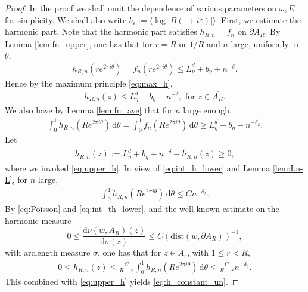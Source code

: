 \documentclass[11pt]{amsart}
\begin{document}
\begin{proof}
In the proof we shall omit the dependence of various parameters on $\omega, E$ for simplicity. We shall also write $b_{\varepsilon}:=\langle \log |B(\cdot+i\varepsilon)|\rangle$.
First, we estimate the harmonic part.
Note that the harmonic part satisfies $h_{R,n}=f_n$ on $\partial A_{R}$.
By Lemma \ref{lem:fn_upper}, one has that for $r=R$ or $1/R$ and $n$ large, uniformly in $\theta$,
\begin{align*}
h_{R,n}(re^{2\pi i\theta})=f_n(re^{2\pi i\theta})\leq L^d_{\eta}+b_{\eta}+n^{-\delta}.
\end{align*}
Hence by the maximum principle \eqref{eq:max_h},  
\begin{align}\label{eq:upper_h}
h_{R,n}(z)\leq L^d_{\eta}+b_{\eta}+n^{-\delta}, \text{ for } z\in \overline{A_{R}}.
\end{align}
We also have by Lemma \ref{lem:fn_ave} that for $n$ large enough,
\begin{align}\label{eq:int_h_lower}
\int_0^1 h_{R,n}(R e^{2\pi i\theta})\, \mathrm{d}\theta=\int_0^{1} f_n(R e^{2\pi i\theta})\, \mathrm{d}\theta\geq L^d_{\eta}+b_{\eta}-n^{-\delta_2}.
\end{align}
Let 
\begin{align}\label{def:tilde_h}
\tilde{h}_{R,n}(z):=L^d_{\eta}+b_{\eta}+n^{-\delta}-h_{R,n}(z)\geq 0,
\end{align} 
where we invoked \eqref{eq:upper_h}.
In view of \eqref{eq:int_h_lower} and Lemma \ref{lem:Ln-L},  for $n$ large,
\begin{align}\label{eq:int_th_lower}
\int_0^{1} \tilde{h}_{R,n}(R e^{2\pi i\theta})\, \mathrm{d}\theta\leq C n^{-\delta_2}.
\end{align}
By \eqref{eq:Poisson} and \eqref{eq:int_th_lower}, and the well-known estimate on the harmonic measure
$$0\leq \frac{\mathrm{d}\nu(w, A_R)(z)}{\mathrm{d}\sigma(z)}\leq C(\mathrm{dist}(w,\partial A_R))^{-1},$$ 
with arclength measure $\sigma$, 
one has that for $z\in A_r$, with $1\leq r<R$,
\begin{align*}
0\leq \tilde{h}_{R,n}(z)\leq \frac{C}{R-r} \int_{0}^{1} \tilde{h}_{R,n}(Re^{2\pi i\theta})\, \mathrm{d}\theta\leq \frac{C}{R-r} n^{-\delta_2}.
\end{align*}
This combined with \eqref{eq:upper_h} yields \eqref{eq:h_constant_un}.


\end{proof}
\end{document}
